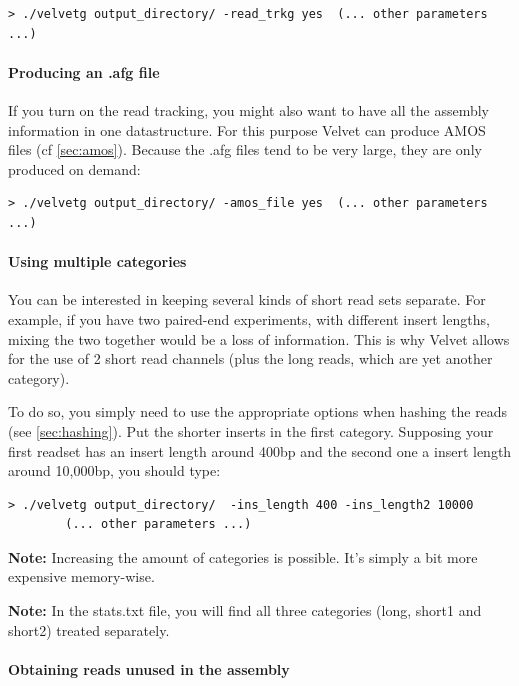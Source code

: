\documentclass{article}
\begin{document}
\begin{verbatim}
> ./velvetg output_directory/ -read_trkg yes  (... other parameters ...)
\end{verbatim}

	\paragraph{Producing an .afg file}
	
If you turn on the read tracking, you might also want to have all the  assembly information in one datastructure. For this purpose Velvet can produce AMOS files (cf \ref{sec:amos}). Because the .afg files tend to be very large, they are only produced on demand:

\begin{verbatim}
> ./velvetg output_directory/ -amos_file yes  (... other parameters ...)
\end{verbatim}

	\paragraph{Using multiple categories}

You can be interested in keeping several kinds of short read sets separate.
For example, if you have two paired-end experiments, with different insert
lengths, mixing the two together would be a loss of information. This is why
Velvet allows for the use of 2 short read channels (plus the long reads, which
are yet another category).

To do so, you simply need to use the appropriate options when hashing the
reads (see \ref{sec:hashing}). Put the shorter inserts in the first category. Supposing your first  readset has an insert length around 400bp and the second one a insert length around 10,000bp, you should type:

\begin{verbatim}
> ./velvetg output_directory/  -ins_length 400 -ins_length2 10000  
		(... other parameters ...)
\end{verbatim}

\textbf{Note:} Increasing the amount of categories is possible. It's simply a bit more
expensive memory-wise. 

\textbf{Note:} In the stats.txt file, you will find all three categories (long,
short1 and short2) treated separately.

	\paragraph{Obtaining reads unused in the assembly}
	
\end{document}
